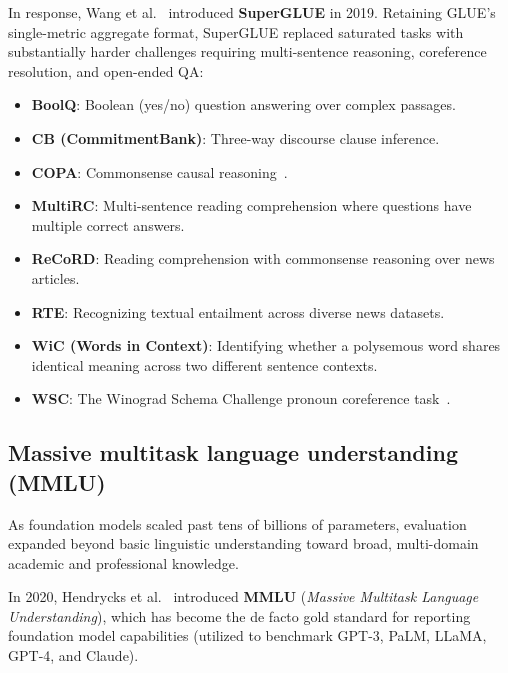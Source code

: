 \documentclass[../../main.tex]{subfiles}
\begin{document}
In response, Wang et al.~\cite{wang2019superglue} introduced \textbf{SuperGLUE} in 2019. Retaining GLUE's single-metric aggregate format, SuperGLUE replaced saturated tasks with substantially harder challenges requiring multi-sentence reasoning, coreference resolution, and open-ended QA:
\begin{itemize}
    \item \textbf{BoolQ}: Boolean (yes/no) question answering over complex passages.
    \item \textbf{CB (CommitmentBank)}: Three-way discourse clause inference.
    \item \textbf{COPA}: Commonsense causal reasoning~\cite{roemmele2011copa}.
    \item \textbf{MultiRC}: Multi-sentence reading comprehension where questions have multiple correct answers.
    \item \textbf{ReCoRD}: Reading comprehension with commonsense reasoning over news articles.
    \item \textbf{RTE}: Recognizing textual entailment across diverse news datasets.
    \item \textbf{WiC (Words in Context)}: Identifying whether a polysemous word shares identical meaning across two different sentence contexts.
    \item \textbf{WSC}: The Winograd Schema Challenge pronoun coreference task~\cite{levesque2012winograd}.
\end{itemize}

\subsection{Massive multitask language understanding (MMLU)}
\label{subsec:mmlu}

As foundation models scaled past tens of billions of parameters, evaluation expanded beyond basic linguistic understanding toward broad, multi-domain academic and professional knowledge.

In 2020, Hendrycks et al.~\cite{hendrycks2020mmlu} introduced \textbf{MMLU} (\textit{Massive Multitask Language Understanding}), which has become the de facto gold standard for reporting foundation model capabilities (utilized to benchmark GPT-3, PaLM, LLaMA, GPT-4, and Claude).
\end{document}
